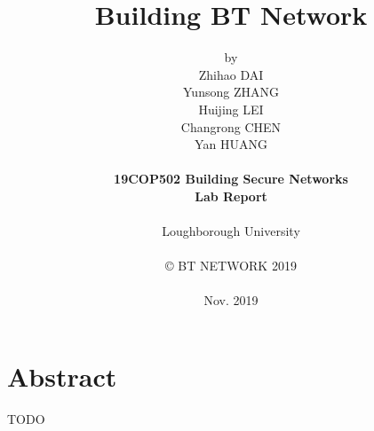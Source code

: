 \title{\bf Building BT Network}

\author{by\\
Zhihao DAI\\
Yunsong ZHANG\\
Huijing LEI\\
Changrong CHEN\\
Yan HUANG\\
\\
{\bf 19COP502 Building Secure Networks}\\
{\bf Lab Report}\\
\\
Loughborough University\\
\\
\copyright
\hspace{1 dd} BT NETWORK 2019\\
\\
Nov. 2019
}
\date{} %

\maketitle


% 
% 

\chapter*{Abstract}
TODO



\setcounter{tocdepth}{2}
\tableofcontents

\listoffigures

\listoftables


\newpage

